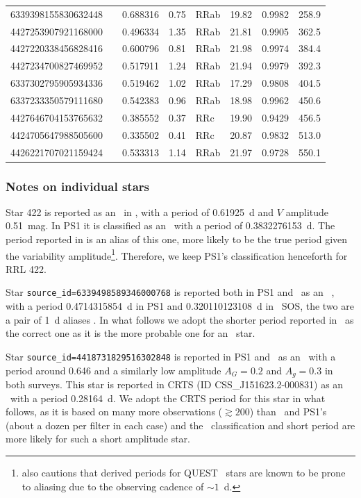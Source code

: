 \documentclass[twocolumn]{aastex63}
\begin{document}
\begin{table}[t]
\begin{footnotesize}
\begin{tabular}{llllllll}
6339398155830632448 &     & 0.688316& 0.75 & RRab & 19.82 & 0.9982 & 258.9 \\
4427253907921168000 &     & 0.496334& 1.35 & RRab & 21.81 & 0.9905 & 362.5 \\
4427220338456828416 &     & 0.600796& 0.81 & RRab & 21.98 & 0.9974 & 384.4 \\
4427234700827469952 &     & 0.517911& 1.24 & RRab & 21.94 & 0.9979 & 392.3 \\
6337302795905934336 &     & 0.519462& 1.02 & RRab & 17.29 & 0.9808 & 404.5 \\
6337233350579111680 &     & 0.542383& 0.96 & RRab & 18.98 & 0.9962 & 450.6 \\
4427646704153765632 &     & 0.385552& 0.37 & RRc  & 19.90 & 0.9429 & 456.5 \\
4424705647988505600 &     & 0.335502& 0.41 & RRc  & 20.87 & 0.9832 & 513.0 \\
4426221707021159424 &     & 0.533313& 1.14 & RRab & 21.97 & 0.9728 & 550.1 \\
\bottomrule
\end{tabular}
\end{footnotesize}
\end{table}

\subsubsection{Notes on individual stars}

Star 422 is reported as an \rrc~in \citet{Vivas2004}, with a period of 0.61925~d and $V$ amplitude 0.51~mag. In PS1 it is classified as an \rrc~with a period of 0.3832276153~d. The period reported in \citet{Vivas2004} is an alias of this one, more likely to be the true period given the variability amplitude\footnote{\citet{Vivas2004} also cautions that derived periods for QUEST \rrc~stars are known to be prone to aliasing due to the observing cadence of $\sim1$~d.}. Therefore, we keep PS1's classification henceforth for RRL 422.

Star \verb+source_id=6339498589346000768+ is reported both in PS1 and \Gaia~as an \rrc~, with a period 0.4714315854~d in PS1 and 0.320110123108~d in \Gaia~SOS, the two are a pair of 1~d aliases \citep[see e.g.]{Lafler1965}. In what follows we adopt the shorter period reported in \Gaia~as the correct one as it is the more probable one for an \rrc~star.

Star \verb+source_id=4418731829516302848+ is reported in PS1 and \Gaia~as an \rrab~with a period around 0.646 and a similarly low amplitude $A_G=0.2$ and $A_g=0.3$ in both surveys. This star is reported in CRTS \citep{Drake2014} (ID CSS\_J151623.2-000831) as an \rrc~with a period 0.28164~d. We adopt the CRTS period for this star in what follows, as it is based on many more observations ($\gtrsim200$) than \Gaia~and PS1's (about a dozen per filter in each case) and the \rrc~classification and short period are more likely for such a short amplitude star.
\end{document}
